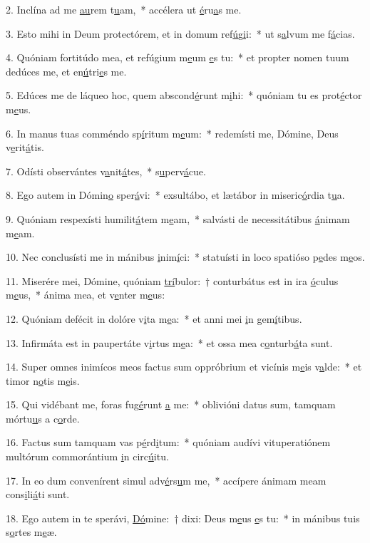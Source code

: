 2. Inclína ad me \uline{au}rem t\uline{u}am,~* accélera ut \uline{é}ru\uline{a}s me.\par 
3. Esto mihi in Deum protectórem, et in domum ref\uline{ú}g\uline{i}i:~* ut s\uline{a}lvum me f\uline{á}cias.\par 
4. Quóniam fortitúdo mea, et refúgium m\uline{e}um \uline{e}s tu:~* et propter nomen tuum dedúces me, et en\uline{ú}tri\uline{e}s me.\par 
5. Edúces me de láqueo hoc, quem abscond\uline{é}runt m\uline{i}hi:~* quóniam tu es prot\uline{é}ctor m\uline{e}us.\par 
6. In manus tuas comméndo sp\uline{í}ritum m\uline{e}um:~* redemísti me, Dómine, Deus v\uline{e}rit\uline{á}tis.\par 
7. Odísti observántes v\uline{a}nit\uline{á}tes,~* s\uline{u}perv\uline{á}cue.\par 
8. Ego autem in Dómin\uline{o} sper\uline{á}vi:~* exsultábo, et lætábor in miseric\uline{ó}rdia t\uline{u}a.\par 
9. Quóniam respexísti humilit\uline{á}tem m\uline{e}am,~* salvásti de necessitátibus \uline{á}nimam m\uline{e}am.\par 
10. Nec conclusísti me in mánibus \uline{i}nim\uline{í}ci:~* statuísti in loco spatióso p\uline{e}des m\uline{e}os.\par 
11. Miserére mei, Dómine, quóniam \uline{trí}bulor:~† conturbátus est in ira \uline{ó}culus m\uline{e}us,~* ánima mea, et v\uline{e}nter m\uline{e}us:\par 
12. Quóniam defécit in dolóre v\uline{i}ta m\uline{e}a:~* et anni mei \uline{i}n gem\uline{í}tibus.\par 
13. Infirmáta est in paupertáte v\uline{i}rtus m\uline{e}a:~* et ossa mea c\uline{o}nturb\uline{á}ta sunt.\par 
14. Super omnes inimícos meos factus sum oppróbrium et vicínis m\uline{e}is v\uline{a}lde:~* et timor n\uline{o}tis m\uline{e}is.\par 
15. Qui vidébant me, foras fug\uline{é}runt \uline{a} me:~* oblivióni datus sum, tamquam mórtu\uline{u}s a c\uline{o}rde.\par 
16. Factus sum tamquam vas p\uline{é}rd\uline{i}tum:~* quóniam audívi vituperatiónem multórum commorántium \uline{i}n circ\uline{ú}itu.\par 
17. In eo dum convenírent simul adv\uline{é}rs\uline{u}m me,~* accípere ánimam meam cons\uline{i}li\uline{á}ti sunt.\par 
18. Ego autem in te sperávi, \uline{Dó}mine:~† dixi: Deus m\uline{e}us \uline{e}s tu:~* in mánibus tuis s\uline{o}rtes m\uline{e}æ.\par 
